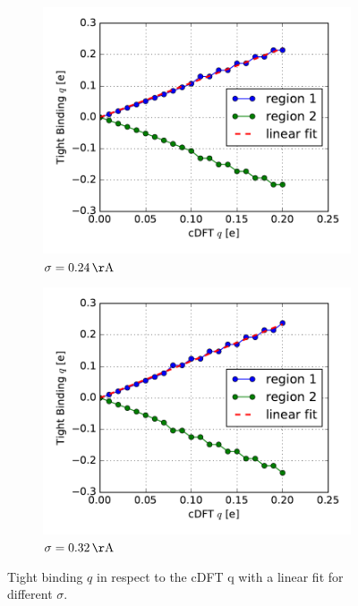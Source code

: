 \begin{figure}
	\centering
	\begin{subfigure}{0.47\textwidth}
		\centering
		\includegraphics[width = \textwidth]{Images/Hydrogen/charging/qs_normal_sigma}
		\caption{$\sigma = \unit[0.24]{\AA}$}
		\label{}
	\end{subfigure}\hspace*{.5cm}
	\begin{subfigure}{0.47\textwidth}
		\centering
		\includegraphics[width = \textwidth]{Images/Hydrogen/charging/qs_other_sigma}
		\caption{$\sigma = \unit[0.32]{\AA}$}
		\label{}
	\end{subfigure}
	\caption{Tight binding $q$ in respect to the cDFT q with a linear fit for different $\sigma$.}
	\label{image_qs_hydrogen}
\end{figure}
